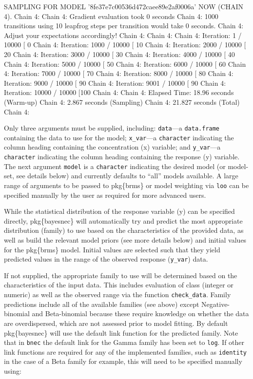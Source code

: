 \documentclass[
]{jss}
\begin{document}
\begin{CodeChunk}
\begin{CodeOutput}
SAMPLING FOR MODEL '8fe37e7c00536d472caee89e2af0006a' NOW (CHAIN 4).
Chain 4: 
Chain 4: Gradient evaluation took 0 seconds
Chain 4: 1000 transitions using 10 leapfrog steps per transition would take 0 seconds.
Chain 4: Adjust your expectations accordingly!
Chain 4: 
Chain 4: 
Chain 4: Iteration:    1 / 10000 [  0%
Chain 4: Iteration: 1000 / 10000 [ 10%
Chain 4: Iteration: 2000 / 10000 [ 20%
Chain 4: Iteration: 3000 / 10000 [ 30%
Chain 4: Iteration: 4000 / 10000 [ 40%
Chain 4: Iteration: 5000 / 10000 [ 50%
Chain 4: Iteration: 6000 / 10000 [ 60%
Chain 4: Iteration: 7000 / 10000 [ 70%
Chain 4: Iteration: 8000 / 10000 [ 80%
Chain 4: Iteration: 9000 / 10000 [ 90%
Chain 4: Iteration: 9001 / 10000 [ 90%
Chain 4: Iteration: 10000 / 10000 [100%
Chain 4: 
Chain 4:  Elapsed Time: 18.96 seconds (Warm-up)
Chain 4:                2.867 seconds (Sampling)
Chain 4:                21.827 seconds (Total)
Chain 4: 
\end{CodeOutput}
\end{CodeChunk}

Only three arguments must be supplied, including: \texttt{data}---a
\texttt{data.frame} containing the data to use for the model;
\texttt{x\_var}---a \texttt{character} indicating the column heading
containing the concentration (x) variable; and \texttt{y\_var}---a
\texttt{character} indicating the column heading containing the response
(y) variable. The next argument \texttt{model} is a \texttt{character}
indicating the desired model (or model-set, see details below) and
currently defaults to ``all'' models available. A large range of
arguments to be passed to pkg\{brms\} or model weighting via
\texttt{loo} can be specified manually by the user as required for more
advanced users.

While the statistical distribution of the response variable (y) can be
specified directly, pkg\{bayesnec\} will automatically try and predict
the most appropriate distribution (family) to use based on the
characteristics of the provided data, as well as build the relevant
model priors (see more details below) and initial values for the
pkg\{brms\} model. Initial values are selected such that they yield
predicted values in the range of the observed response (\texttt{y\_var})
data.

If not supplied, the appropriate family to use will be determined based
on the characteristics of the input data. This includes evaluation of
class (integer or numeric) as well as the observed range via the
function \texttt{check\_data}. Family predictions include all of the
available families (see above) except Negative-binomial and
Beta-binomial because these require knowledge on whether the data are
overdispersed, which are not assessed prior to model fitting. By default
pkg\{bayesnec\} will use the default link function for the predicted
family. Note that in \texttt{bnec} the default link for the Gamma family
has been set to \texttt{log}. If other link functions are required for
any of the implemented families, such as \texttt{identity} in the case
of a Beta family for example, this will need to be specified manually
using:
\end{document}
